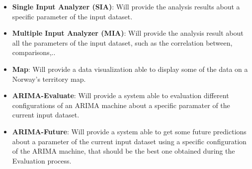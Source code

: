 \vspace{-5mm}
\begin{itemize}
 \item \textbf{Single Input Analyzer (SIA)}: Will provide the analysis results about a specific parameter of the input dataset.
 \item \textbf{Multiple Input Analyzer (MIA)}: Will provide the analysis result about all the parameters of the input dataset, such as the correlation between, comparisons,.. 
 \item \textbf{Map}: Will provide a data visualization able to display some of the data on a Norway's territory map.
 \item \textbf{ARIMA-Evaluate}: Will provide a system able to evaluation different configurations of an ARIMA machine about a specific paramater of the current input dataset.
 \item \textbf{ARIMA-Future}: Will provide a system able to get some future predictions about a parameter of the current input dataset using a specific configuration of the ARIMA machine, that should be the best one obtained during the Evaluation process.
\end{itemize} 






